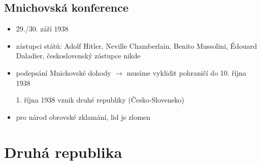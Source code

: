 \documentclass{article}
\begin{document}
\subsection*{Mnichovská konference}
\begin{itemize}
    \item 29./30. září 1938
    \item zástupci států: Adolf Hitler, Neville Chamberlain, Benito Mussolini, Édouard Daladier, československý zástupce nikde
    \item podepsání Mnichovské dohody $\rightarrow$ musíme vyklidit pohraničí do 10. října 1938
    \item[1. října 1938] vznik druhé republiky (Česko-Slovensko)
    \item pro národ obrovské zklamání, lid je zlomen
\end{itemize}

\section*{Druhá republika}
\end{document}
